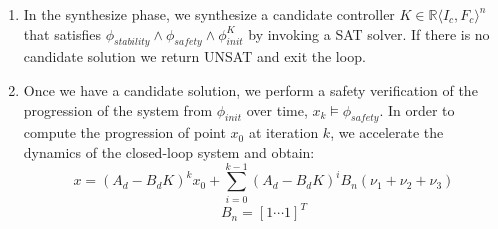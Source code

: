 \documentclass[twocolumn]{autart}    %
\newcommand{\mat}[1]{{#1}}
\begin{document}
\begin{enumerate}
\begin{enumerate}
\end{enumerate}
\item In the {\sc synthesize} phase, we synthesize a candidate controller
  $K \in \mathbb{R}\langle I_c,F_c\rangle^n$ that satisfies
  $\phi_\mathit{stability} \wedge \phi_\mathit{safety} \wedge \phi_\mathit{init}^{K}$ by invoking a SAT solver.
If there is no candidate solution we return UNSAT and exit the loop.
\item Once we have a candidate solution, we perform a safety verification %
  of the 
  progression of the system from $\phi_\mathit{init}$ over time,
$x_{k} \models \phi_\mathit{safety}$. %
  In order to compute the progression of point $x_0$ at iteration $k$,
  we accelerate the dynamics of the closed-loop system and obtain:
%
{
\scriptsize
\begin{equation}
x=(A_d-B_dK)^kx_0+ \sum_{i=0}^{k-1} (A_d-B_dK)^i B_{n}(\nu_1+\nu_2+\nu_3)%
\end{equation}
\begin{equation}
B_n= [1 \cdots 1]^T
\end{equation}
}


\end{enumerate}
\end{document}
